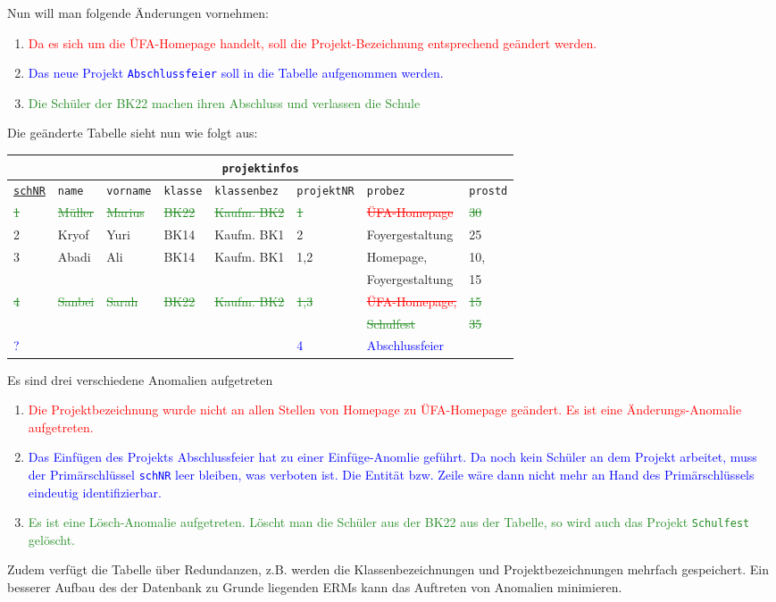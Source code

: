 Nun will man folgende Änderungen vornehmen:
\begin{enumerate}
	\item \textcolor{red}{Da es sich um die ÜFA-Homepage handelt, soll die Projekt-Bezeichnung entsprechend geändert werden.}
	\item \textcolor{blue}{Das neue Projekt \texttt{Abschlussfeier} soll in die Tabelle aufgenommen werden.}
	\item \textcolor{ForestGreen}{Die Schüler der BK22 machen ihren Abschluss und verlassen die Schule}
\end{enumerate}
Die geänderte Tabelle sieht nun wie folgt aus:
\begin{tabular}{llllllll}
	\multicolumn{8}{c}{\lstinline!projektinfos!}\\
	\hline
	\underline{\lstinline!schNR!}&\lstinline!name!&\lstinline!vorname!&\lstinline!klasse!&\lstinline!klassenbez!&\lstinline!projektNR!&\lstinline!probez!&\lstinline!prostd!\\
	\hline
	\textcolor{ForestGreen}{\sout{1}} &
	\textcolor{ForestGreen}{\sout{Müller}} &
	\textcolor{ForestGreen}{\sout{Marius}} &
	\textcolor{ForestGreen}{\sout{BK22}} &
	\textcolor{ForestGreen}{\sout{Kaufm. BK2}}&
	\textcolor{ForestGreen}{\sout{1}} &
	\textcolor{red}{\sout{ÜFA-Homepage}} &
	\textcolor{ForestGreen}{\sout{30}} \\
	2 &
	Kryof  &
	Yuri &
	BK14 &
	Kaufm. BK1&
	2 &
	Foyergestaltung &
	25 \\
	3 &
	Abadi &
	Ali &
	BK14 &
	Kaufm. BK1&
	1,2 &
	Homepage,&
	10,\\
	&&&&&&Foyergestaltung&15\\
	\textcolor{ForestGreen}{\sout{4}}&
	\textcolor{ForestGreen}{\sout{Sanbei}}&
	\textcolor{ForestGreen}{\sout{Sarah}}&
	\textcolor{ForestGreen}{\sout{BK22}}&
	\textcolor{ForestGreen}{\sout{Kaufm. BK2}}&
	\textcolor{ForestGreen}{\sout{1,3}}&
	\textcolor{red}{\sout{ÜFA-Homepage,}}&
	\textcolor{ForestGreen}{\sout{15}}\\
	&&&&&&\textcolor{ForestGreen}{\sout{Schulfest}}&\textcolor{ForestGreen}{\sout{35}}\\
	\textcolor{blue}{?}&
	&
	&
	&
	&
	\textcolor{blue}{4} &
	\textcolor{blue}{Abschlussfeier}&
	\\
\end{tabular}\newpage
Es sind drei verschiedene Anomalien aufgetreten
\begin{enumerate}
	\item \textcolor{red}{Die Projektbezeichnung wurde nicht an allen Stellen von Homepage zu ÜFA-Homepage geändert. Es ist eine Änderungs-Anomalie aufgetreten.}
	\item \textcolor{blue}{Das Einfügen des Projekts Abschlussfeier hat zu einer Einfüge-Anomlie geführt. Da noch kein Schüler an dem Projekt arbeitet, muss der Primärschlüssel \lstinline!schNR! leer bleiben, was verboten ist. Die Entität bzw. Zeile wäre dann nicht mehr an Hand des Primärschlüssels eindeutig identifizierbar.}
	\item \textcolor{ForestGreen}{Es ist eine Lösch-Anomalie aufgetreten. Löscht man die Schüler aus der BK22 aus der Tabelle, so wird auch das Projekt \texttt{Schulfest} gelöscht.}
\end{enumerate}
Zudem verfügt die Tabelle über Redundanzen, z.B. werden die Klassenbezeichnungen und Projektbezeichnungen mehrfach gespeichert. Ein besserer Aufbau des der Datenbank zu Grunde liegenden ERMs kann das Auftreten von Anomalien minimieren.